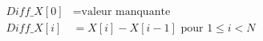 \[
\begin{aligned}
Diff\_X[0] &= \text{valeur manquante} \\
Diff\_X[i] &= X[i] - X[i-1] \textrm{ pour } 1 \le i < N
\end{aligned}
\]
